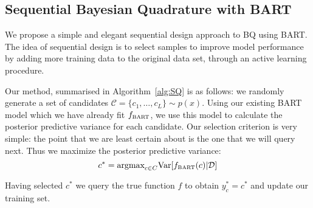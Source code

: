 
\subsection{Sequential Bayesian Quadrature with BART}
\label{Sequential Design}

We propose a simple and elegant sequential design approach to BQ using BART. The idea of sequential design is to select samples to improve model performance by adding more training data to the original data set, through an active learning procedure.

Our method, summarised in Algorithm~\ref{alg:SQ} is as follows: we randomly generate a set of candidates
$\mathcal{C} = \{c_1, \ldots, c_L\}\sim p(x)$.  Using our existing BART model which we have already fit $f_{\bart}$, we use this model to calculate the posterior predictive variance for each candidate. Our selection criterion is very simple: the point that we are least certain about is the one that we will query next. Thus we maximize the posterior predictive variance:
\begin{equation}
	c^* = \mbox{argmax}_{c \in C} \mbox{Var}[f_{\bart}(c) |\mathcal{D}]
	\label{eq:maxvariance}
\end{equation}

Having selected $c^*$ we query the true function $f$ to obtain $y_c^* = c^*$ and update our training set.

